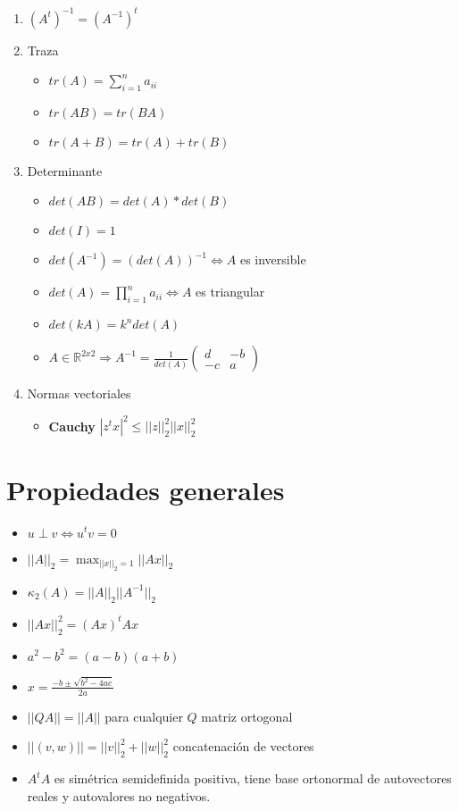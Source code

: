 \documentclass[10pt]{article}
\begin{document}
\begin{enumerate}
\begin{itemize}
    \end{itemize}
    \item $(A^t)^{-1} = (A^{-1})^t$
    \item Traza
    \begin{itemize}
        \item $tr(A) = \sum_{i=1}^{n}a_{ii}$ 
    \item $tr(AB) = tr(BA)$
    \item $tr(A+B) = tr(A)+tr(B)$
    \end{itemize}
    \item Determinante
    \begin{itemize}
        \item $det(AB) = det(A)*det(B)$
        \item $det(I) = 1$
        \item $det(A^{-1}) = (det(A))^{-1} \iff A$ es inversible
        \item $det(A) = \prod_{i=1}^{n}a_{ii} \iff A$ es triangular 
        \item $det(kA) = k^ndet(A)$
        \item $A \in \mathbb{R}^{2x2} \Rightarrow A^{-1} = \frac{1}{det(A)} \begin{pmatrix}
                        d & -b\\
                        -c & a
                        \end{pmatrix}$
    \end{itemize}
    \item Normas vectoriales
    \begin{itemize}
        \item \textbf{Cauchy} $|z^tx|^2 \leq ||z||_2^2 ||x||_2^2$
    \end{itemize}
\end{enumerate}

\section*{Propiedades generales}
\begin{itemize}
    \item $u \perp v \iff u^tv=0$
    \item $||A||_2 = \max_{||x||_2=1} ||Ax||_2$
    \item $\kappa_2(A) = ||A||_2 ||A^{-1}||_2$
    \item $||Ax||_2^2 = (Ax)^t Ax$
    
    \item $a^2-b^2 = (a-b) (a+b)$
    \item $x = \frac {-b \pm \sqrt {b^2 - 4ac}}{2a}$
    \item $||QA|| = ||A||$ para cualquier $Q$ matriz ortogonal
    \item $||(v,w)|| = ||v||_2^2+||w||_2^2$ concatenación de vectores
    \item $A^tA$ es simétrica semidefinida positiva, tiene base ortonormal de autovectores reales y autovalores no negativos. 
\end{itemize}
\end{document}
